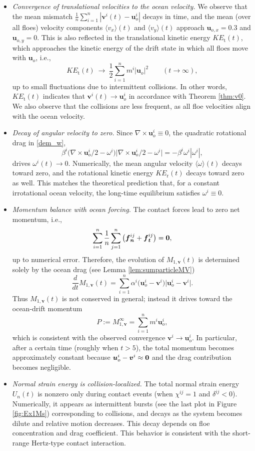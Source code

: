 \documentclass[a4paper,11pt]{article}
\numberwithin{equation}{section}
\theoremstyle{definition}
\newcommand{\bfv}{\boldsymbol{v}}
\newcommand{\bfn}{\boldsymbol{n}}
\newcommand{\bft}{\boldsymbol{t}}
\newcommand{\bfu}{\boldsymbol{u}_o}
\newcommand{\bfuu}{\boldsymbol{u}}
\newcommand{\bff}{\boldsymbol{f}}
\begin{document}
\begin{itemize}
\item \textit{Convergence of translational velocities to the ocean velocity.}
We observe that the mean mismatch
$\frac1n\sum_{i=1}^n|\bfv^i(t)-\bfu^i|$ decays in time, and the mean (over all floes) velocity components $\langle v_x\rangle(t)$ and $\langle v_y\rangle(t)$ approach $\bfuu_{o,x}=0.3$ and $\bfuu_{o,y}=0$. 
This is also reflected in the translational kinetic energy $KE_{\mathrm{t}}(t)$, which approaches the kinetic energy of the drift state in which all floes move with $\bfu$, i.e.,
\[
KE_{\mathrm{t}}(t)\ \longrightarrow\ \frac12\sum_{i=1}^n m^i|\bfu|^2
\qquad (t\to\infty),
\]
up to small fluctuations due to intermittent collisions.   In other words, $KE_{\mathrm{t}}(t)$ indicates that $\bfv^i(t)\to\bfu^i$ in accordance with Theorem \ref{thm:v0}.
We also observe that the collisions are less frequent, as all floe velocities align with the ocean velocity.
\item \textit{Decay of angular velocity to zero.}
Since $\nabla\times\bfu^i\equiv 0$, the quadratic rotational drag in \eqref{dem_w},
\[
\beta^i\Big(\nabla\times \bfu^i/2-\omega^i\Big)\Big|\nabla\times \bfu^i/2-\omega^i\Big|
= - \beta^i \omega^i|\omega^i|,
\]
drives $\omega^i(t)\to 0$. Numerically, the mean angular velocity $\langle\omega\rangle(t)$ decays toward zero, and the rotational kinetic energy $KE_{\mathrm{r}}(t)$ decays toward zero as well. This matches the theoretical prediction that, for a constant irrotational ocean velocity, the long-time equilibrium satisfies $\omega^i\equiv 0$.

\item \textit{Momentum balance with ocean forcing.}
The contact forces lead to zero net momentum, i.e.,
\[
\sum_{i=1}^n\frac{1}{n}\sum_{j=1}^n\big(\bff_{\bfn}^{ij}+\bff_{\bft}^{ij}\big)=\bf0,
\]
up to numerical error. Therefore, the evolution of $M_{1,\bfv}(t)$ is determined solely by the ocean drag (see Lemma \ref{lem:sumparticleMV})
\[
\frac{d}{dt}M_{1,\bfv}(t)=\sum_{i=1}^n \alpha^i\big(\bfu^i-\bfv^i\big)\big|\bfu^i-\bfv^i\big|.
\]
Thus $M_{1,\bfv}(t)$ is not conserved in general; instead it drives toward the ocean-drift momentum
\[
P := M_{1,\bfv}^\infty = \sum_{i=1}^n m^i\bfu^i,
\]
which is consistent with the observed convergence $\bfv^i\to\bfu^i$. In particular, after a certain time (roughly when $t>5$), the total momentum becomes approximately constant because $\bfu^i-\bfv^i\approx \bf0$ and the drag contribution becomes negligible.

\item \textit{Normal strain energy is collision-localized.}
The total normal strain energy $U_n(t)$ is nonzero only during contact events (when $\chi^{ij}=1$ and $\delta^{ij}<0$). Numerically, it appears as intermittent bursts (see the last plot in Figure \ref{fig:Ex1Ms}) corresponding to collisions, and decays as the system becomes dilute and relative motion decreases. This decay depends on floe concentration and drag coefficient. This behavior is consistent with the short-range Hertz-type contact interaction.
\end{itemize}
\end{document}
